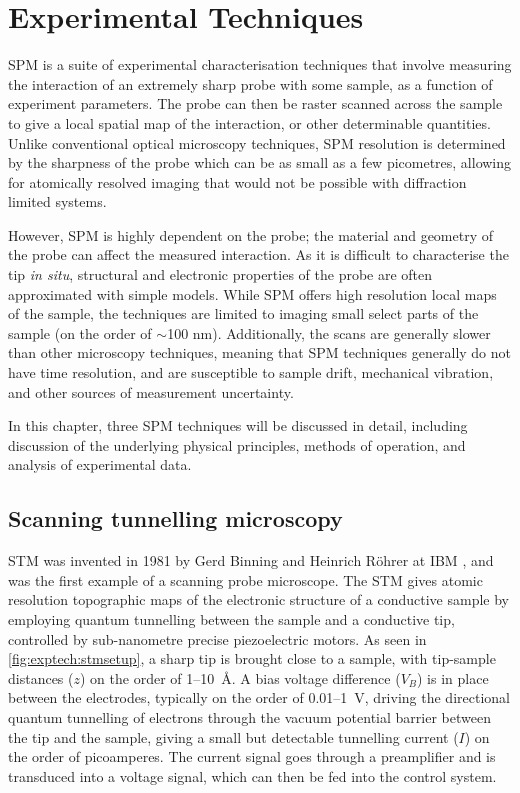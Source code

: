 
\chapter{Experimental Techniques}
\label{ch:exptech}

\Acf{SPM} is a suite of experimental characterisation techniques that involve measuring the interaction of an extremely sharp probe with some sample, as a function of experiment parameters. The probe can then be raster scanned across the sample to give a local spatial map of the interaction, or other determinable quantities. Unlike conventional optical microscopy techniques, \ac{SPM} resolution is determined by the sharpness of the probe which can be as small as a few picometres, allowing for atomically resolved imaging that would not be possible with diffraction limited systems. 

However, \ac{SPM} is highly dependent on the probe; the material and geometry of the probe can affect the measured interaction. As it is difficult to characterise the tip \textit{in situ}, structural and electronic properties of the probe are often approximated with simple models. While \ac{SPM} offers high resolution local maps of the sample, the techniques are limited to imaging small select parts of the sample (on the order of $\sim$100 nm). Additionally, the scans are generally slower than other microscopy techniques, meaning that \ac{SPM} techniques generally do not have time resolution, and are susceptible to sample drift, mechanical vibration, and other sources of measurement uncertainty.

In this chapter, three \ac{SPM} techniques will be discussed in detail, including discussion of the underlying physical principles, methods of operation, and analysis of experimental data.



\section{Scanning tunnelling microscopy}

\Acf{STM} was invented in 1981 by Gerd Binning and Heinrich R\"ohrer at IBM \citep{binnig1982surface}, and was the first example of a scanning probe microscope. The \ac{STM} gives atomic resolution topographic maps of the electronic structure of a conductive sample by employing quantum tunnelling between the sample and a conductive tip, controlled by sub-nanometre precise piezoelectric motors. As seen in \autoref{fig:exptech:stmsetup}, a sharp tip is brought close to a sample, with tip-sample distances ($z$) on the order of 1--\SI{10}{\angstrom}. A bias voltage difference ($V_B$) is in place between the electrodes, typically on the order of 0.01--\SI{1}{\volt}, driving the directional quantum tunnelling of electrons through the vacuum potential barrier between the tip and the sample, giving a small but detectable tunnelling current ($I$) on the order of picoamperes. The current signal goes through a preamplifier and is transduced into a voltage signal, which can then be fed into the control system.

